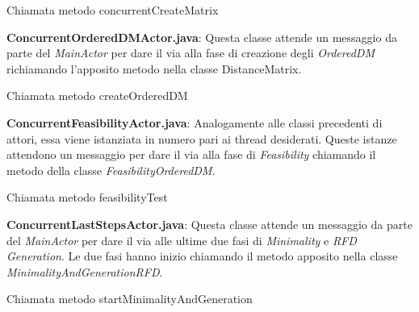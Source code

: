 \begin{listing}[H]
	\caption{Chiamata metodo concurrentCreateMatrix}
	\label{Code:9}
\end{listing}
\textbf{ConcurrentOrderedDMActor.java}:
Questa classe attende un messaggio da parte del \emph{MainActor} per dare il via alla fase di creazione degli \emph{OrderedDM} richiamando l'apposito metodo nella classe DistanceMatrix.\\
\begin{listing}[H]
	\caption{Chiamata metodo createOrderedDM}
	\label{Code:10}
\end{listing}
\textbf{ConcurrentFeasibilityActor.java}:
Analogamente alle classi precedenti di attori, essa viene istanziata in numero pari ai thread desiderati.
Queste istanze attendono un messaggio per dare il via alla fase di \emph{Feasibility} chiamando il metodo della classe \emph{FeasibilityOrderedDM}.\\
\begin{listing}[H]
	\caption{Chiamata metodo feasibilityTest}
	\label{Code:11}
\end{listing}
\textbf{ConcurrentLastStepsActor.java}:
Questa classe attende un messaggio da parte del \emph{MainActor} per dare il via alle ultime due fasi di \emph{Minimality} e \emph{RFD Generation}.
Le due fasi hanno inizio chiamando il metodo apposito nella classe \emph{MinimalityAndGenerationRFD}.
\begin{listing}[H]
	\caption{Chiamata metodo startMinimalityAndGeneration}
	\label{Code:12}
\end{listing}
